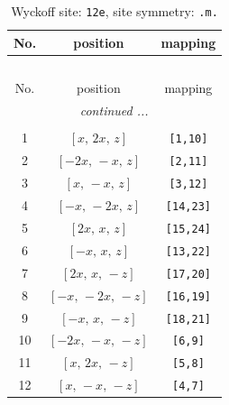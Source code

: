 \documentclass[fleqn,8pt]{jsarticle}
\begin{document}
\begin{longtable}{ccc}
\caption{Wyckoff site: {\tt 12e}, site symmetry: {\tt .m.}}
 \\
 \hline \hline
No. & position & mapping \\ \hline \endfirsthead

\multicolumn{2}{l}{\tablename\ \thetable{}} \\
 \hline \hline
No. & position & mapping \\ \hline \endhead

 \hline \hline
\multicolumn{2}{r}{\footnotesize\it continued ...} \\ \endfoot

 \hline \hline
\multicolumn{2}{r}{} \\ \endlastfoot

1 & $\left[ x,\, 2 x,\, z \right]$ & {\tt [1,10]} \\ \hline
2 & $\left[ - 2 x,\, - x,\, z \right]$ & {\tt [2,11]} \\ \hline
3 & $\left[ x,\, - x,\, z \right]$ & {\tt [3,12]} \\ \hline
4 & $\left[ - x,\, - 2 x,\, z \right]$ & {\tt [14,23]} \\ \hline
5 & $\left[ 2 x,\, x,\, z \right]$ & {\tt [15,24]} \\ \hline
6 & $\left[ - x,\, x,\, z \right]$ & {\tt [13,22]} \\ \hline
7 & $\left[ 2 x,\, x,\, - z \right]$ & {\tt [17,20]} \\ \hline
8 & $\left[ - x,\, - 2 x,\, - z \right]$ & {\tt [16,19]} \\ \hline
9 & $\left[ - x,\, x,\, - z \right]$ & {\tt [18,21]} \\ \hline
10 & $\left[ - 2 x,\, - x,\, - z \right]$ & {\tt [6,9]} \\ \hline
11 & $\left[ x,\, 2 x,\, - z \right]$ & {\tt [5,8]} \\ \hline
12 & $\left[ x,\, - x,\, - z \right]$ & {\tt [4,7]} \\
\end{longtable}
\renewcommand{\arraystretch}{1.2}
\end{document}
